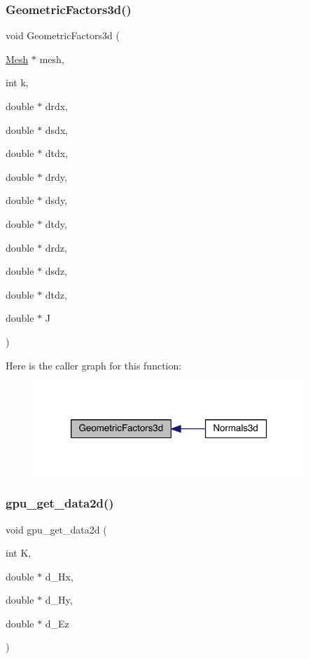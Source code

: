 \subsubsection{\texorpdfstring{Geometric\+Factors3d()}{GeometricFactors3d()}}
{\footnotesize\ttfamily void Geometric\+Factors3d (\begin{DoxyParamCaption}\item[{\hyperlink{a00557_aeffbe0891ab73a4d8964c9cb7978426e}{Mesh} $\ast$}]{mesh,  }\item[{int}]{k,  }\item[{double $\ast$}]{drdx,  }\item[{double $\ast$}]{dsdx,  }\item[{double $\ast$}]{dtdx,  }\item[{double $\ast$}]{drdy,  }\item[{double $\ast$}]{dsdy,  }\item[{double $\ast$}]{dtdy,  }\item[{double $\ast$}]{drdz,  }\item[{double $\ast$}]{dsdz,  }\item[{double $\ast$}]{dtdz,  }\item[{double $\ast$}]{J }\end{DoxyParamCaption})}

Here is the caller graph for this function\+:\nopagebreak
\begin{figure}[H]
\begin{center}
\leavevmode
\includegraphics[width=290pt]{a00554_a962817a1e01d941ede2d0a7e31f136d7_icgraph}
\end{center}
\end{figure}
\mbox{\label{a00554_a9a91b5a9124c99d834ef1283492fe734}} 
\subsubsection{\texorpdfstring{gpu\+\_\+get\+\_\+data2d()}{gpu\_get\_data2d()}}
{\footnotesize\ttfamily void gpu\+\_\+get\+\_\+data2d (\begin{DoxyParamCaption}\item[{int}]{K,  }\item[{double $\ast$}]{d\+\_\+\+Hx,  }\item[{double $\ast$}]{d\+\_\+\+Hy,  }\item[{double $\ast$}]{d\+\_\+\+Ez }\end{DoxyParamCaption})}

